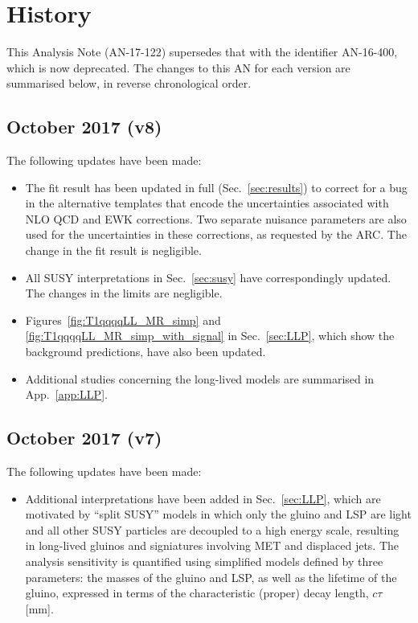 
\section{History}
\label{sec:history}

This Analysis Note (AN-17-122) supersedes that with the identifier
AN-16-400, which is now deprecated. The changes to this AN for each
version are summarised below, in reverse chronological order.

\subsection{October 2017 (v8)}

The following updates have been made:
\begin{itemize}
\item The fit result has been updated in full (Sec.~\ref{sec:results})
  to correct for a bug in the alternative templates that encode the
  uncertainties associated with NLO QCD and EWK corrections. Two
  separate nuisance parameters are also used for the uncertainties in
  these corrections, as requested by the ARC. The change in the fit
  result is negligible.
\item All SUSY interpretations in Sec.~\ref{sec:susy} have
  correspondingly updated. The changes in the limits are negligible.
\item Figures~\ref{fig:T1qqqqLL_MR_simp} and
  \ref{fig:T1qqqqLL_MR_simp_with_signal} in Sec.~\ref{sec:LLP}, which
  show the background predictions, have also been updated.
\item Additional studies concerning the long-lived models are
  summarised in App.~\ref{app:LLP}. 
\end{itemize}

\subsection{October 2017 (v7)}

The following updates have been made:
\begin{itemize}
\item Additional interpretations have been added in
  Sec.~\ref{sec:LLP}, which are motivated by ``split SUSY'' models in
  which only the gluino and LSP are light and all other SUSY particles
  are decoupled to a high energy scale, resulting in long-lived
  gluinos and signiatures involving MET and displaced jets. The
  analysis sensitivity is quantified using simplified models defined
  by three parameters: the masses of the gluino and LSP, as well as
  the lifetime of the gluino, expressed in terms of the characteristic
  (proper) decay length, $c\tau$ [mm].
\end{itemize}

